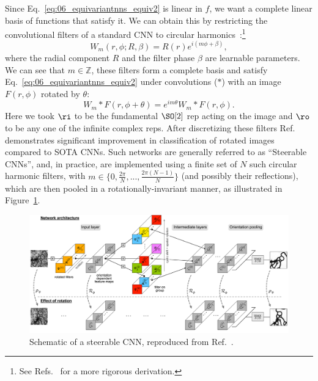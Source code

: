 Since Eq.~\ref{eq:06_equivariantnns_equiv2} is linear in $f$, we want a complete linear basis of functions that satisfy it.
We can obtain this by restricting the convolutional filters of a standard CNN to circular harmonics~\cite{worrall2017harmonic}:\footnote{See Refs.~\cite{weiler20183d, weiler2019general} for a more rigorous derivation.}
\begin{equation}\label{eq:06_equivariantnns_circharms}
    W_m(r, \phi; R, \beta)=R(r)e^{i(m\phi + \beta)},
\end{equation}
where the radial component $R$ and the filter phase $\beta$ are learnable parameters.
We can see that $m \in \mathbb Z$, these filters form a complete basis and satisfy Eq.~\ref{eq:06_equivariantnns_equiv2} under convolutions ($*$) with an image $F(r, \phi)$ rotated by $\theta$:
\begin{equation}
    W_m * F(r, \phi + \theta) = e^{im\theta} W_m * F(r, \phi).
\end{equation}
Here we took $\ri$ to be the fundamental $\SO[2]$ rep acting on the image and $\ro$ to be any one of the infinite complex reps.
After discretizing these filters Ref.~\cite{worrall2017harmonic} demonstrates significant improvement in classification of rotated images compared to SOTA CNNs.
Such networks are generally referred to as ``Steerable CNNs'', and, in practice, are implemented using a finite set of $N$ such circular harmonic filters, with $m \in \{0, \frac{2\pi}{N}, ..., \frac{2\pi(N-1)}{N}\}$ (and possibly their reflections), which are then pooled in a rotationally-invariant manner, as illustrated in Figure~\ref{fig:06_equivariantnns_scnn}.

\begin{figure}[ht]
    \centering
    \captionsetup{justification=centering}
    \includegraphics[width=\textwidth]{figures/06-ML4Jets/equivariantnns/scnns}
    \caption{Schematic of a steerable CNN, reproduced from Ref.~\cite{weiler2018learning}.}
    \label{fig:06_equivariantnns_scnn}
\end{figure}


